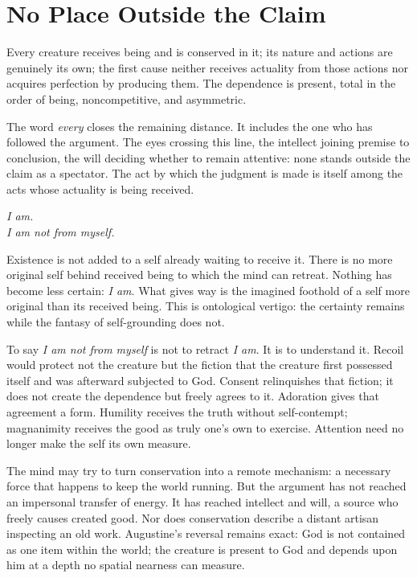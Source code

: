 \section{No Place Outside the Claim}

Every creature receives being and is conserved in it; its nature and actions are genuinely its own; the first cause neither receives actuality from those actions nor acquires perfection by producing them. The dependence is present, total in the order of being, noncompetitive, and asymmetric.

The word \emph{every} closes the remaining distance. It includes the one who has followed the argument. The eyes crossing this line, the intellect joining premise to conclusion, the will deciding whether to remain attentive: none stands outside the claim as a spectator. The act by which the judgment is made is itself among the acts whose actuality is being received.

\begin{center}
\emph{I am.}\\[0.65em]
\emph{I am not from myself.}
\end{center}

Existence is not added to a self already waiting to receive it. There is no more original self behind received being to which the mind can retreat. Nothing has become less certain: \emph{I am}. What gives way is the imagined foothold of a self more original than its received being. This is ontological vertigo: the certainty remains while the fantasy of self-grounding does not.

To say \emph{I am not from myself} is not to retract \emph{I am}. It is to understand it. Recoil would protect not the creature but the fiction that the creature first possessed itself and was afterward subjected to God. Consent relinquishes that fiction; it does not create the dependence but freely agrees to it. Adoration gives that agreement a form. Humility receives the truth without self-contempt; magnanimity receives the good as truly one's own to exercise. Attention need no longer make the self its own measure.

The mind may try to turn conservation into a remote mechanism: a necessary force that happens to keep the world running. But the argument has not reached an impersonal transfer of energy. It has reached intellect and will, a source who freely causes created good. Nor does conservation describe a distant artisan inspecting an old work. Augustine's reversal remains exact: God is not contained as one item within the world; the creature is present to God and depends upon him at a depth no spatial nearness can measure.

